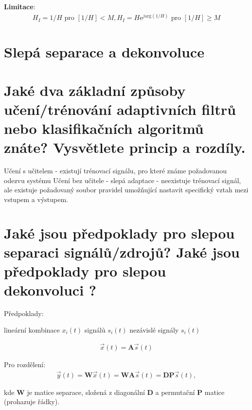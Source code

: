 \documentclass[a4paper,12pt]{article}   %
\newcommand{\mt}[1]{$#1$}
\newcommand{\e}{\text{e}}
\begin{document}
\textbf{Limitace}:
\begin{align*}
        H_I = 1/H \text{ pro } [1/H] < M, H_I = H\e^{j\text{arg}(1/H)} \text{ pro } [1/H] \geq M
\end{align*}




\clearpage

\section*{Slepá separace a dekonvoluce}

\section{Jaké dva základní způsoby učení/trénování adaptivních filtrů nebo klasifikačních algoritmů znáte? Vysvětlete princip a rozdíly.}

\begin{outline}
        \1 Učení s učitelem - existují trénovací signálu, pro které známe požadovanou odezvu systému
        \1 Učení bez učitele - slepá adaptace - neexistuje trénovací signál, ale existuje požadovaný soubor pravidel umožňující nastavit specifický vztah mezi vstupem a výstupem. 
\end{outline}


\section{Jaké jsou předpoklady pro slepou separaci signálů/zdrojů? Jaké jsou předpoklady pro slepou dekonvoluci ?}

Předpoklady:
\begin{outline}
        \1 lineární kombinace \mt{x_i(t)} signálů \mt{s_i(t)}
        \1 nezávislé signály \mt{s_i(t)}
\end{outline}
\begin{align*}
        \vec{x}(t) = \pmb A \vec s(t)
\end{align*}

Pro rozdělení:
\begin{align*}
        \vec{y}(t) = \pmb W \vec x(t) =  \pmb W\pmb A \vec s(t) = \pmb D \pmb P \vec s(t),
\end{align*}

kde \mt{\pmb W} je matice separace, složená z diagonální \mt{\pmb D} a permutační \mt{\pmb P} matice (prohazuje řádky). 
\end{document}
